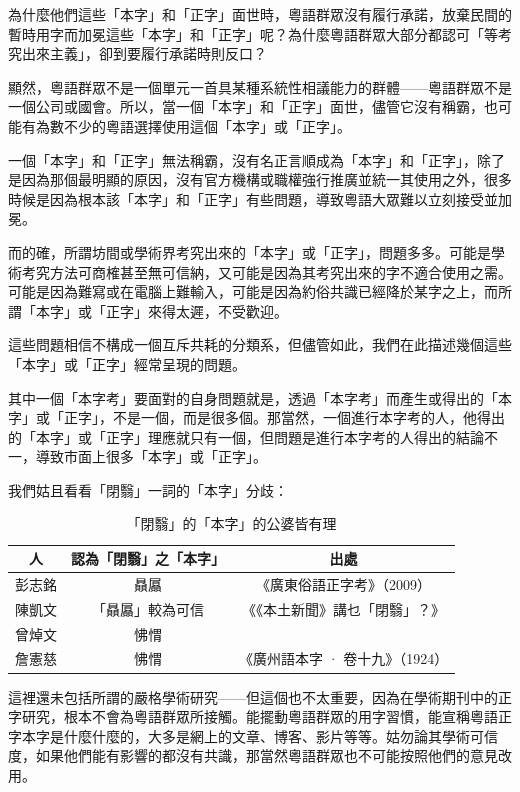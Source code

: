 \documentclass[a5paper, 10pt, openany]{book} %
\begin{document}
為什麼他們這些「本字」和「正字」面世時，粵語群眾沒有履行承諾，放棄民間的暫時用字而加冕這些「本字」和「正字」呢？為什麼粵語群眾大部分都認可「等考究出來主義」，卻到要履行承諾時則反口？

顯然，粵語群眾不是一個單元一首具某種系統性相議能力的群體——粵語群眾不是一個公司或國會。所以，當一個「本字」和「正字」面世，儘管它沒有稱霸，也可能有為數不少的粵語選擇使用這個「本字」或「正字」。

一個「本字」和「正字」無法稱霸，沒有名正言順成為「本字」和「正字」，除了是因為那個最明顯的原因，沒有官方機構或職權強行推廣並統一其使用之外，很多時候是因為根本該「本字」和「正字」有些問題，導致粵語大眾難以立刻接受並加冕。

而的確，所謂坊間或學術界考究出來的「本字」或「正字」，問題多多。可能是學術考究方法可商榷甚至無可信納，又可能是因為其考究出來的字不適合使用之需。可能是因為難寫或在電腦上難輸入，可能是因為約俗共識已經降於某字之上，而所謂「本字」或「正字」來得太遲，不受歡迎。

這些問題相信不構成一個互斥共耗的分類系，但儘管如此，我們在此描述幾個這些「本字」或「正字」經常呈現的問題。

其中一個「本字考」要面對的自身問題就是，透過「本字考」而產生或得出的「本字」或「正字」，不是一個，而是很多個。那當然，一個進行本字考的人，他得出的「本字」或「正字」理應就只有一個，但問題是進行本字考的人得出的結論不一，導致市面上很多「本字」或「正字」。

我們姑且看看「閉翳」一詞的「本字」分歧：

\begin{table}[h!]
  \centering
  \begin{tabular}{|c|c|c|}
  \hline
  \textbf{人} & \textbf{認為「閉翳」之「本字」} & \textbf{出處} \\ \hline
  彭志銘 & 贔屭 & 《廣東俗語正字考》（2009） \\ \hline
  陳凱文 & 「贔屭」較為可信 & 《《本土新聞》講乜「閉翳」？》 \\ \hline
  曾焯文 & 怫㥜 & \\ \hline
  詹憲慈 & 怫㥜 & 《廣州語本字 · 卷十九》（1924） \\ \hline
  \end{tabular}
  \caption{「閉翳」的「本字」的公婆皆有理}
  \end{table}

這裡還未包括所謂的嚴格學術研究——但這個也不太重要，因為在學術期刊中的正字研究，根本不會為粵語群眾所接觸。能擺動粵語群眾的用字習慣，能宣稱粵語正字本字是什麼什麼的，大多是網上的文章、博客、影片等等。姑勿論其學術可信度，如果他們能有影響的都沒有共識，那當然粵語群眾也不可能按照他們的意見改用。
\end{document}
